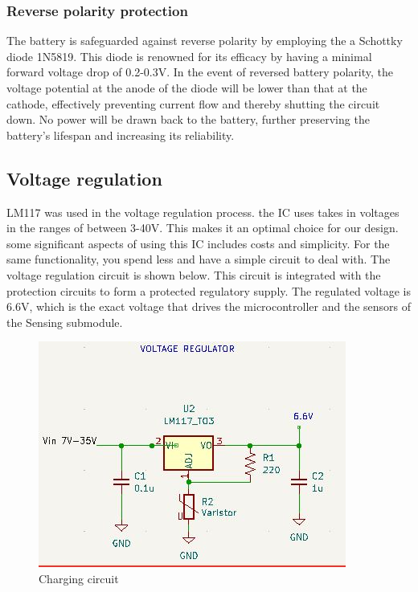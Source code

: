 \documentclass[class=report,11pt,crop=false]{standalone}
\begin{document}
	\subsubsection{Reverse polarity protection}
	\vspace{0.5cm}
	
	The battery is safeguarded against reverse polarity by employing the a Schottky diode 1N5819. This diode is renowned for its efficacy by having a minimal forward voltage drop of 0.2-0.3V. In the event of reversed battery polarity, the voltage potential at the anode of the diode will be lower than that at the cathode, effectively preventing current flow and thereby shutting the circuit down. No power will be drawn back to the battery, further preserving the battery's lifespan and increasing its reliability.
	
	
	\subsection{Voltage regulation}
	LM117 was used in the voltage regulation process. the IC uses takes in voltages in the ranges of between 3-40V. This makes it an optimal choice for our design. some significant aspects of using this IC includes costs and simplicity. For the same functionality, you spend less and have a simple circuit to deal with. The voltage regulation circuit is shown below. This circuit is integrated with the protection circuits to form a protected regulatory supply. The regulated voltage is 6.6V, which is the exact voltage that drives the microcontroller and the sensors of the Sensing submodule.  
	
	\begin{figure}[h!]
		\centering
		\includegraphics[width=0.9\linewidth]{Figures/regulator.jpg}
		\caption{Charging circuit}
		\label{fig: P1}
	\end{figure}
	
\end{document}
